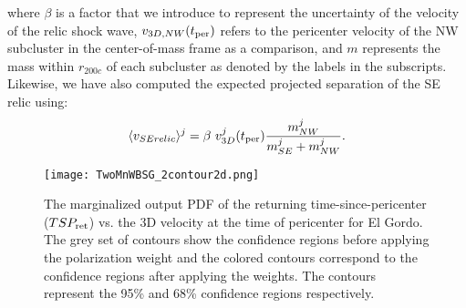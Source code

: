 \documentclass[ucdthesis.tex]{subfiles}
\begin{document}
    where  $\beta$ is a factor that we introduce to represent the
    uncertainty of the velocity of the relic shock wave, $v_{3D, NW}(t_{\rm per})$ 
    refers to the pericenter velocity of
    the NW subcluster in the center-of-mass frame as a comparison, and $m$
    represents the mass within $r_{200c}$ of each subcluster as denoted by the
    labels in the subscripts. 
    Likewise, we have also computed the expected projected separation of the SE
    relic using:  
    \begin{equation}
    	\label{eqn:SE_speed}
    	\langle v_{SE relic} \rangle^j = \beta~v^j_{3D}(t_{\rm per}) \frac{m^j_{NW}}{m^j_{SE} + m^j_{NW}}. 
    \end{equation}
    \par 
    \begin{figure}
    	\texttt{[image: TwoMnWBSG\_2contour2d.png]}
    	\caption{The marginalized output PDF of the returning time-since-pericenter
    ($TSP_{\rm ret}$) vs. the 3D velocity at the time of pericenter for El Gordo. The
    grey set of contours show the confidence regions before applying the
    polarization weight and the colored contours correspond to the confidence
    regions after applying the weights. The contours represent the 95\% and
    68\% confidence regions respectively. }
    	\label{fig:TSP_v3D}
    \end{figure}
    
\end{document}
